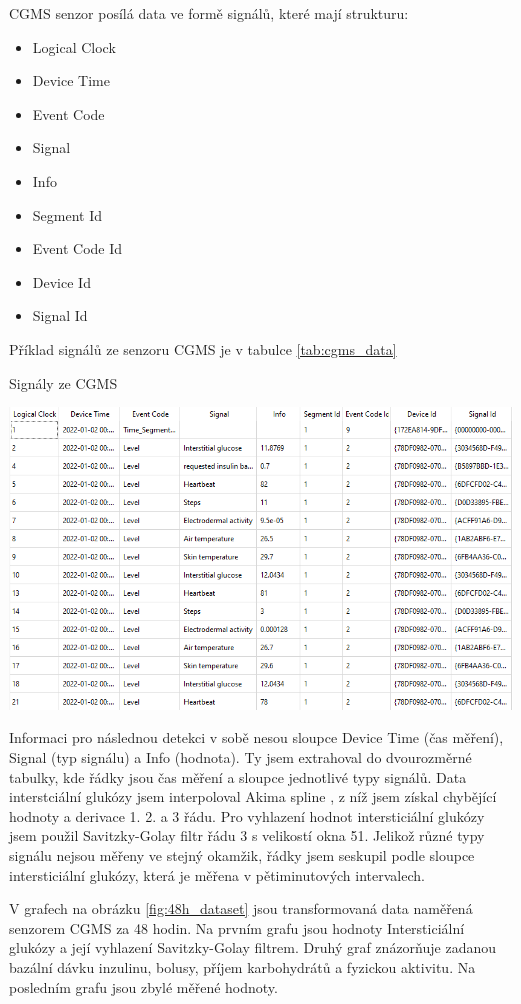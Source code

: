 CGMS senzor posílá data ve formě signálů, které mají strukturu:
\begin{itemize}
\setlength\itemsep{0em}
\item Logical Clock
\item Device Time
\item Event Code
\item Signal
\item Info
\item Segment Id
\item Event Code Id
\item Device Id
\item Signal Id
\end{itemize}

Příklad signálů ze senzoru CGMS je v tabulce \ref{tab:cgms_data}

\begin{table}[H]
\caption{Signály ze CGMS}
\label{tab:cgms_data}
\centering
\includegraphics[width=1\textwidth]{img/cho/cgms_data.png}
\end{table}

Informaci pro následnou detekci v sobě nesou sloupce Device Time (čas měření), Signal (typ signálu) a Info (hodnota). Ty jsem extrahoval do dvourozměrné tabulky, kde řádky jsou čas měření a sloupce jednotlivé typy signálů.
Data interstciální glukózy jsem interpoloval Akima spline \citep{cho.akima}, z níž jsem získal chybějící hodnoty a derivace 1. 2. a 3 řádu. Pro vyhlazení hodnot intersticiální glukózy jsem použil Savitzky-Golay filtr \citep{cho.savgol} řádu 3 s velikostí okna 51. Jelikož různé typy signálu nejsou měřeny ve stejný okamžik, řádky jsem seskupil podle sloupce intersticiální glukózy, která je měřena v pětiminutových intervalech.

V grafech na obrázku \ref{fig:48h_dataset} jsou transformovaná data naměřená senzorem CGMS za 48 hodin. Na prvním grafu jsou hodnoty Intersticiální glukózy a její vyhlazení Savitzky-Golay filtrem. Druhý graf znázorňuje zadanou bazální dávku inzulinu, bolusy, příjem karbohydrátů a fyzickou aktivitu. Na posledním grafu jsou zbylé měřené hodnoty.


